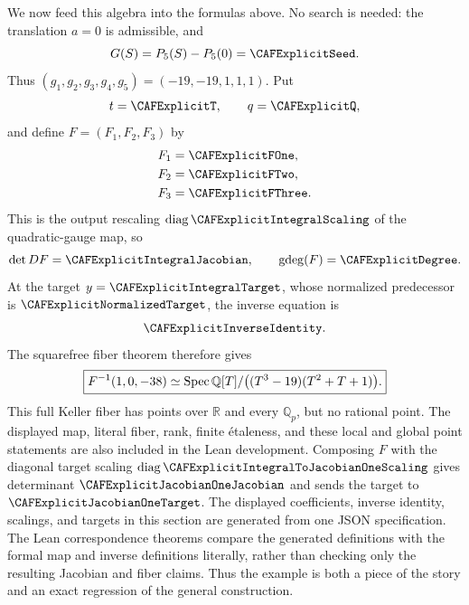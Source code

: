 We now feed this algebra into the formulas above.  No search is needed: the
translation \(a=0\) is admissible, and
\[
 G(S)=P_5(S)-P_5(0)
 =\CAFExplicitSeed.
\]
Thus \((g_1,g_2,g_3,g_4,g_5)=(-19,-19,1,1,1)\).  Put
\[
 t=\CAFExplicitT,\qquad q=\CAFExplicitQ,
\]
and define \(F=(F_1,F_2,F_3)\) by
\begin{align}
 F_1={}&\CAFExplicitFOne,\notag\\
 F_2={}&\CAFExplicitFTwo,\notag\\
 F_3={}&\CAFExplicitFThree.
 \label{eq:explicit-quintic-map}
\end{align}
This is the output rescaling
\(\operatorname{diag}\CAFExplicitIntegralScaling\) of the quadratic-gauge
map, so
\[
 \det DF=\CAFExplicitIntegralJacobian,\qquad
 \gdeg(F)=\CAFExplicitDegree.
\]
At the target \(y=\CAFExplicitIntegralTarget\), whose normalized predecessor
is \(\CAFExplicitNormalizedTarget\), the inverse equation is
\[
 \CAFExplicitInverseIdentity.
\]
The squarefree fiber theorem therefore gives
\[
 \boxed{F^{-1}(1,0,-38)
 \simeq\operatorname{Spec}\mathbb Q[T]/\bigl((T^3-19)(T^2+T+1)\bigr).}
\]
This full Keller fiber has points over \(\mathbb R\) and every
\(\mathbb Q_p\), but no rational point.  The displayed map, literal fiber,
rank, finite \'etaleness, and these local and global point statements are
also included in the Lean development.  Composing \(F\) with the diagonal
target scaling
\(\operatorname{diag}\CAFExplicitIntegralToJacobianOneScaling\) gives
determinant \(\CAFExplicitJacobianOneJacobian\) and sends the target to
\(\CAFExplicitJacobianOneTarget\).
The displayed coefficients, inverse identity, scalings, and targets in this
section are generated from one JSON specification.  The Lean correspondence
theorems compare the generated definitions with the formal map and inverse
definitions literally, rather than checking only the resulting Jacobian and
fiber claims.  Thus the example is both a piece of the story and an exact
regression of the general construction.
